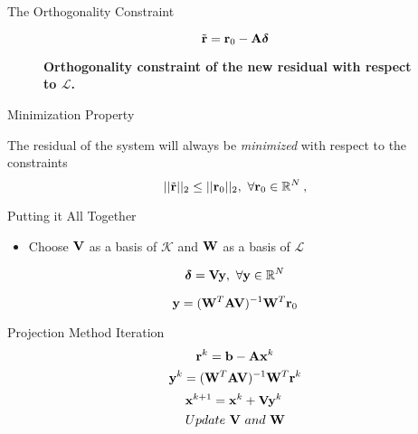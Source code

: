 \documentclass{beamer}
\begin{document}
\begin{frame}{The Orthogonality Constraint}

  \[
  \tilde{\mathbf{r}} = \mathbf{r}_0 - \mathbf{A}\boldsymbol{\delta}
  \]

  \begin{figure}[htpb!]
    \begin{center}
      \scalebox{1.25}{
         }
    \end{center}
    \caption{\textbf{Orthogonality constraint of the new residual with
        respect to $\mathcal{L}$.} }
  \end{figure}

  \pause
  \begin{beamerboxesrounded}[upper=boxheadcolor,lower=boxbodycolor,shadow=true]
    {Minimization Property}

    The residual of the system will always be \textit{minimized} with
    respect to the constraints
    \[
    ||\tilde{\ve{r}}||_2 \leq ||\ve{r}_0||_2,\ \forall \ve{r}_0 \in
    \mathbb{R}^N\:,
    \]
  \end{beamerboxesrounded}

\end{frame}

\begin{frame}{Putting it All Together}

  \begin{itemize}
  \item Choose $\mathbf{V}$ as a basis of $\mathcal{K}$ and $\mathbf{W}$ as a
    basis of $\mathcal{L}$
  \end{itemize}

  \[
  \boldsymbol{\delta} = \ve{V}\ve{y},\ \forall \ve{y} \in
  \mathbb{R}^N
  \]

  \[
  \mathbf{y} = (\mathbf{W}^T\mathbf{A}\mathbf{V})^{-1}\mathbf{W}^T\mathbf{r}_0
  \]

  \pause
  \begin{beamerboxesrounded}[upper=boxheadcolor,lower=boxbodycolor,shadow=true]
    {Projection Method Iteration}
  \[
  \mathbf{r}^k = \mathbf{b} - \mathbf{A}\mathbf{x}^k
  \]
  \[
  \mathbf{y}^k = (\mathbf{W}^T\mathbf{A}\mathbf{V})^{-1}\mathbf{W}^T\mathbf{r}^k
  \]
  \[
  \mathbf{x}^{k+1} = \mathbf{x}^k + \mathbf{V}\mathbf{y}^k\:
  \]
  \[
  Update\ \ve{V}\ and\ \ve{W}
  \]
  \end{beamerboxesrounded}

\end{frame}
\end{document}
